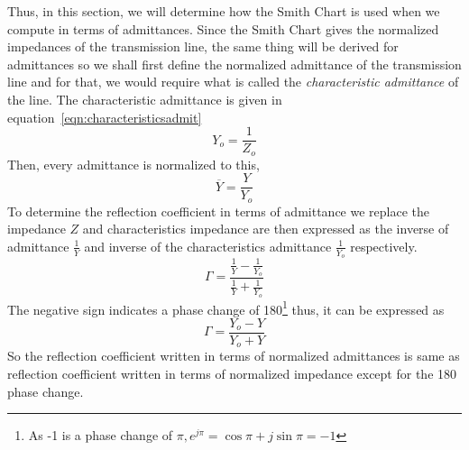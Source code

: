Thus, in this section, we will determine how the Smith Chart is used when we compute in terms of admittances. Since the Smith Chart gives the normalized impedances of the transmission line, the same thing will be derived for admittances so we shall first define the normalized admittance of the transmission line and for that, we would require what is called the \emph{characteristic admittance} of the line. The characteristic admittance is given in equation~\eqref{eqn:characteristicsadmit}
\begin{equation}
Y_o= \frac{1}{Z_o}
\end{equation}
Then, every admittance is normalized to this,
\begin{equation*}
\overline{Y} = \frac{Y}{Y_o} 
\end{equation*}
To determine the reflection coefficient in terms of admittance we replace the impedance $Z$ and characteristics impedance are then expressed as the inverse of admittance $\frac{1}{Y}$ and inverse of the characteristics admittance $\frac{1}{Y_o}$ respectively.
\begin{equation*}
\Gamma = \frac{\frac{1}{Y} - \frac{1}{Y_o}}{\frac{1}{Y} + \frac{1}{Y_o}}
\end{equation*}
The negative sign indicates a phase change of 180\textdegree\footnote{
As -1 is a phase change of $\pi, e^{j\pi} = \cos\pi + j\sin\pi = -1$
} thus, it can be expressed as
\begin{equation}
\Gamma= \frac{Y_o - Y}{Y_o + Y} 
\end{equation}
So the reflection coefficient written in terms of normalized admittances is same as reflection coefficient written in terms of normalized impedance except for the 180\textdegree\; phase change.

